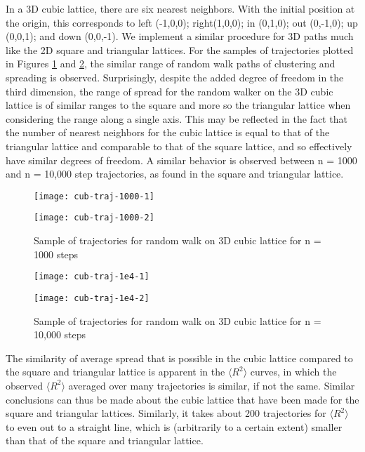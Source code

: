 \documentclass[12pt, oneside]{article}
\begin{document}
In a 3D cubic lattice, there are six nearest neighbors. With the initial position at the origin, this corresponds to left (-1,0,0); right(1,0,0); in (0,1,0); out (0,-1,0); up (0,0,1); and down (0,0,-1). We implement a similar procedure for 3D paths much like the 2D square and triangular lattices. For the samples of trajectories plotted in Figures \ref{fig:cubtraj1000} and \ref{fig:cubtraj1e4}, the similar range of random walk paths of clustering and spreading is observed. Surprisingly, despite the added degree of freedom in the third dimension, the range of spread for the random walker on the 3D cubic lattice is of similar ranges to the square and more so the triangular lattice when considering the range along a single axis. This may be reflected in the fact that the number of nearest neighbors for the cubic lattice is equal to that of the triangular lattice and comparable to that of the square lattice, and so effectively have similar degrees of freedom. A similar behavior is observed between n = 1000 and n = 10,000 step trajectories, as found in the square and triangular lattice.

\begin{figure}
\begin{minipage}[htbp]{.49\linewidth}
\centering
\texttt{[image: cub-traj-1000-1]}
\end{minipage}
\begin{minipage}[htbp]{.49\linewidth}
\centering
\texttt{[image: cub-traj-1000-2]}
\end{minipage}
\caption{Sample of trajectories for random walk on 3D cubic lattice for n = 1000 steps}
\label{fig:cubtraj1000}
\end{figure}

\begin{figure}
\begin{minipage}[htbp]{.49\linewidth}
\centering
\texttt{[image: cub-traj-1e4-1]}
\end{minipage}
\begin{minipage}[htbp]{.49\linewidth}
\centering
\texttt{[image: cub-traj-1e4-2]}
\end{minipage}
\caption{Sample of trajectories for random walk on 3D cubic lattice for n = 10,000 steps}
\label{fig:cubtraj1e4}
\end{figure}

The similarity of average spread that is possible in the cubic lattice compared to the square and triangular lattice is apparent in the $\langle R^2 \rangle$ curves, in which the observed $\langle R^2 \rangle$ averaged over many trajectories is similar, if not the same. Similar conclusions can thus be made about the cubic lattice that have been made for the square and triangular lattices. Similarly, it takes about 200 trajectories for $\langle R^2 \rangle$ to even out to a straight line, which is (arbitrarily to a certain extent) smaller than that of the square and triangular lattice.
\end{document}
